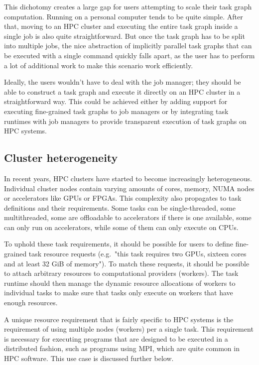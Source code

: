 This dichotomy creates a large gap for users attempting to scale their task graph
computation. Running on a personal computer tends to be quite simple. After that, moving to an
HPC cluster and executing the entire task graph inside a single job is also quite
straightforward. But once the task graph has to be split into multiple jobs, the nice
abstraction of implicitly parallel task graphs that can be executed with a single command
quickly falls apart, as the user has to perform a lot of additional work to make this scenario
work efficiently.

Ideally, the users wouldn't have to deal with the job manager; they should be
able to construct a task graph and execute it directly on an HPC cluster in a straightforward
way. This could be achieved either by adding support for executing fine-grained task graphs to
job managers or by integrating task runtimes with job managers to provide transparent execution
of task graphs on HPC systems.

\subsection{Cluster heterogeneity}
In recent years, HPC clusters have started to become increasingly heterogeneous.
Individual cluster nodes contain varying amounts of cores, memory, NUMA nodes or accelerators
like GPUs or FPGAs. This complexity also propagates to task definitions and their requirements.
Some tasks can be single-threaded, some multithreaded, some are offloadable to accelerators if
there is one available, some can only run on accelerators, while some of them can only execute
on CPUs.

To uphold these task requirements, it should be possible for users to define fine-grained
task resource requests (e.g.\ "this task requires two GPUs, sixteen cores and at least 32 GiB of
memory"). To match these requests, it should be possible to attach arbitrary resources to
computational providers (workers). The task runtime should then manage the dynamic resource
allocations of workers to individual tasks to make sure that tasks only execute on workers that
have enough resources.

A unique resource requirement that is fairly specific to HPC systems is the requirement of using
multiple nodes (workers) per a single task. This requirement is necessary for executing programs
that are designed to be executed in a distributed fashion, such as programs using MPI, which are
quite common in HPC software. This use case is discussed further below.

